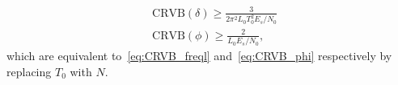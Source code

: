 \begin{appendices}
\begin{equation}
\label{eq:derivation_CRVB_from_FIM}
\begin{aligned}
&\text{CRVB}(\delta) \geq \frac{3}{2\pi^{2}L_{0}T_{0}^{2}E_s/N_{0}} \\
&\text{CRVB}(\phi) \geq \frac{2}{L_{0}E_s/N_{0}},
\end{aligned}
\end{equation}
which are equivalent to~\eqref{eq:CRVB_freql} and~\eqref{eq:CRVB_phi} respectively by replacing $T_0$ with $N$.

\end{appendices}
    